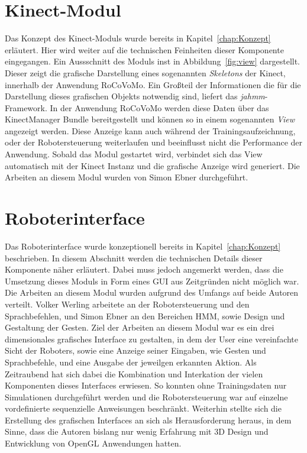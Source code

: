 \section{Kinect-Modul}
Das Konzept des Kinect-Moduls wurde bereits in Kapitel~\ref{chap:Konzept} erl\"autert. Hier wird weiter auf die technischen Feinheiten dieser Komponente eingegangen.
\newline
Ein Aussschnitt des Moduls inst in Abbildung~\ref{fig:view} dargestellt. Dieser zeigt die grafische Darstellung eines sogenannten \textit{Skeletons} der Kinect, innerhalb der Anwendung RoCoVoMo.
\newline
Ein Gro\ss teil der Informationen die f\"ur die Darstellung dieses grafischen Objekts notwendig sind, liefert das \textit{jahmm}-Framework. In der Anwendung RoCoVoMo werden diese Daten \"uber das KinectManager Bundle bereitgestellt und k\"onnen so in einem sogenannten \textit{View} angezeigt werden. Diese Anzeige kann auch w\"ahrend der Trainingsaufzeichnung, oder der Robotersteuerung  weiterlaufen und beeinflusst nicht die Performance der Anwendung.
\newline
Sobald das Modul gestartet wird, verbindet sich das View automatisch mit der Kinect Instanz und die grafische Anzeige wird generiert.
\newline
Die Arbeiten an diesem Modul wurden von Simon Ebner durchgef\"uhrt.

\section{Roboterinterface}
Das Roboterinterface wurde konzeptionell bereits in Kapitel~\ref{chap:Konzept} beschrieben. In diesem Abschnitt werden die technischen Details dieser Komponente n\"aher erl\"autert. Dabei muss jedoch angemerkt werden, dass die Umsetzung dieses Moduls in Form eines \gls{GUI} aus Zeitgr\"unden nicht m\"oglich war. Die Arbeiten an diesem Modul wurden aufgrund des Umfangs auf beide Autoren verteilt. Volker Werling arbeitete an der Robotersteuerung und den Sprachbefehlen, und Simon Ebner an den Bereichen \gls{HMM}, sowie Design und Gestaltung der Gesten.
\newline
Ziel der Arbeiten an diesem Modul war es ein drei dimensionales grafisches Interface zu gestalten, in dem der User eine vereinfachte Sicht der Roboters, sowie eine Anzeige seiner Eingaben, wie Gesten und Sprachbefehle, und eine Ausgabe der jeweilgen erkannten Aktion. Als Zeitraubend hat sich dabei die Kombination und Interkation der vielen Komponenten dieses Interfaces erwiesen. So konnten ohne Trainingsdaten nur Simulationen durchgef\"uhrt werden und die Robotersteuerung war auf einzelne vordefinierte sequenzielle Anweisungen beschr\"ankt. Weiterhin stellte sich die Erstellung des grafischen Interfaces an sich als Herausforderung heraus, in dem Sinne, dass die Autoren bislang nur wenig Erfahrung mit 3D Design und Entwicklung von OpenGL Anwendungen hatten.

